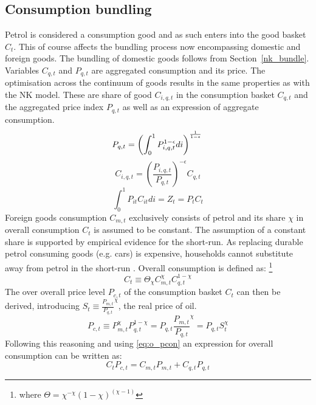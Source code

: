 \documentclass[12pt,a4paper,english]{article} %
\begin{document}
	\subsection{Consumption bundling}
	Petrol is considered a consumption good and as such enters into the good basket $C_t$. This of course affects the bundling process now encompassing domestic and foreign goods. The bundling of domestic goods follows from Section~\ref{nk_bundle}. Variables $C_{q,t}$ and $P_{q,t}$ are aggregated consumption and its price. The optimisation across the continuum of goods results in the same properties as with the NK model. These are share of good $C_{i,q,t}$ in the consumption basket $C_{q,t}$ and the aggregated price index $P_{q,t}$ as well as an expression of aggregate consumption.
	\begin{equation} \label{eq:o_pindex}
		P_{q,t} = \left( \int_{0}^{1} P_{i,q,t}^{1 - \epsilon} di \right)^{\frac{1}{1-\epsilon}} \\
	\end{equation}
	\begin{equation} \label{eq:o_cshare}
		C_{i,q,t} = \left( \frac{P_{i,q,t}}{P_{q,t}} \right)^{-\epsilon} C_{q,t}
	\end{equation}
	\begin{equation} \label{eq:o_pcon}
		\int_{0}^{1} P_{it} C_{it} di = Z_t = P_t C_t
	\end{equation}
	Foreign goods consumption $C_{m,t}$ exclusively consists of petrol and its share $\chi$ in overall consumption $C_t$ is assumed to be constant. The assumption of a constant share is supported by empirical evidence for the short-run. As replacing durable petrol consuming goods (e.g. cars) is expensive, households cannot substitute away from petrol in the short-run \cite{blanchard_macroeconomic_2007}. Overall consumption is defined as: \footnote{where $\Theta = \chi^{-\chi}(1-\chi)^{(\chi-1)}$}
	\begin{equation}
		C_t \equiv \Theta_\chi C_{m,t}^\chi C_{q,t}^{1-\chi}
	\end{equation}
	The over overall price level $P_{c,t}$ of the consumption basket $C_t$ can then be derived, introducing $S_t \equiv \frac{P_{m,t}}{P_{q,t}}^\chi$, the real price of oil.
	\begin{equation}
		P_{c,t} \equiv P_{m,t}^\chi P_{q,t}^{1-\chi} 
			= P_{q,t} \frac{P_{m,t}}{P_{q,t}}^\chi
			= P_{q,t} S_t^\chi
	\end{equation}
	Following this reasoning and using \eqref{eq:o_pcon} an expression for overall consumption can be written as:
	\begin{equation}
		C_t P_{c,t} = C_{m,t}P_{m,t} + C_{q,t}P_{q,t}
	\end{equation}
\end{document}
